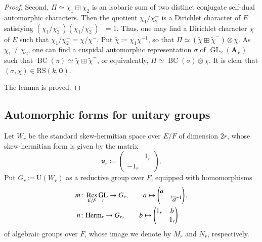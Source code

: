 \documentclass[12pt]{amsart}
\numberwithin{equation}{section}
\theoremstyle{plain}
\theoremstyle{definition}
\theoremstyle{remark}
\renewcommand{\b}[1]{\mathbf{#1}}
\renewcommand{\r}[1]{\mathrm{#1}}
\renewcommand{\(}{\left(}
\renewcommand{\)}{\right)}
\newcommand{\ol}[1]{\overline{#1}{}}
\newcommand{\bA}{\b A}
\newcommand{\rU}{\r U}
\newcommand{\tw}{\mathtt{w}}
\newcommand{\pres}[2]{\prescript{#1}{}{#2}}
\newcommand{\Herm}{\r{Herm}}
\newcommand{\RS}{\r{RS}}
\DeclareMathOperator{\BC}{BC}
\DeclareMathOperator{\GL}{GL}
\DeclareMathOperator{\Res}{Res}
\begin{document}
\begin{proof}
Second, $\Pi\simeq\chi_1\boxplus\chi_2$ is an isobaric sum of two distinct conjugate self-dual automorphic characters. Then the quotient $\chi_1/\chi_2^-$ is a Dirichlet character of $E$ satisfying $(\chi_1/\chi_2^-)(\chi_1/\chi_2^-)^-=1$. Thus, one may find a Dirichlet character $\chi$ of $E$ such that $\chi_1/\chi_2^-=\chi/\chi^-$. Put $\tilde\chi\coloneqq\chi_1\chi^{-1}$, so that $\Pi\simeq(\tilde\chi\boxplus\tilde\chi^-)\otimes\chi$. As $\chi_1\neq\chi_2$, one can find a cuspidal automorphic representation $\sigma$ of $\GL_2(\bA_F)$ such that $\BC(\pi)\simeq\tilde\chi\boxplus\tilde\chi^-$, or equivalently, $\Pi\simeq\BC(\sigma)\otimes\chi$. It is clear that $(\sigma,\chi)\in\RS(k,\b{0})$.

The lemma is proved.
\end{proof}



\subsection{Automorphic forms for unitary groups}
\label{ss:automorphic_unitary}




Let $W_r$ be the standard skew-hermitian space over $E/F$ of dimension $2r$, whose skew-hermitian form is given by the matrix \[
\tw_r\coloneqq\begin{pmatrix}  & 1_r \\ -1_r &  \end{pmatrix}.
\]
Put $G_r\coloneqq\rU(W_r)$ as a reductive group over $F$, equipped with homomorphisms
\begin{align*}
m&\colon\Res_{E/F}\GL_r\to G_r,\qquad  a\mapsto
\begin{pmatrix} a  &  \\  &\pres{t}{\ol{a}}^{-1}   \end{pmatrix}, \\
n&\colon\Herm_r\to G_r,\qquad   b\mapsto
\begin{pmatrix} 1_r  & b \\  & 1_r   \end{pmatrix}
\end{align*}
of algebraic groups over $F$, whose image we denote by $M_r$ and $N_r$, respectively.
\end{document}
